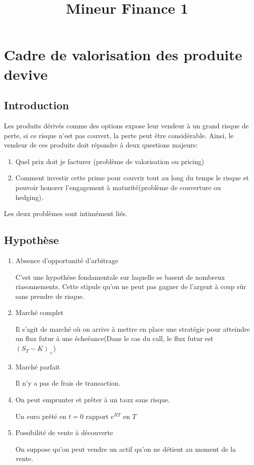 \documentclass{article}
\title{Mineur Finance 1}
\theoremstyle{plain}
\theoremstyle{definition}
\begin{document}
\maketitle

\tableofcontents
\pagebreak

\section{Cadre de valorisation des produite devive}
\subsection{Introduction}
Les produits d\'eriv\'es comme des options expose leur vendeur \`a un grand risque de perte, si ce risque n'est pas couvert, la perte peut \^etre consid\'erable. Ainsi, le vendeur de ces produits doit r\'epondre \`a deux questions majeurs:
\begin{enumerate}
	\item Quel prix doit je facturer (probl\`eme de valorisation ou pricing)
	\item Comment investir cette prime pour couvrir tout au long du temps le risque et pouvoir honorer l'engagement \`a maturit\'e(probl\`eme de couverture ou hedging).
\end{enumerate}

Les deux probl\`emes sont intim\'ement li\'es.
 
\subsection{Hypoth\`ese}
\begin{enumerate}
	\item Absence d'opportunit\'e d'arbitrage
	
	C'est une hypoth\`ese fondamentale sur laquelle se basent de nombreux riasonnements. Cette stipule qu'on ne peut pas gagner de l'argent \`a coup s\^ur sans prendre de risque.
	
	\item March\'e complet
	
	Il s'agit de march\'e o\`u on arrive \`a mettre en place une strat\'egie pour atteindre un flux futur \`a une \'eche\'eance(Dans le cas du call, le flux futur est $(S_T-K)_+$)
	
	\item March\'e parfait
	
	Il n'y a pas de frais de transaction.
	
	\item On peut emprunter et pr\^eter \`a un taux sans risque.
	
	Un euro pr\^et\'e en $t=0$ rapport $e^{RT}$ en $T$
	
	\item Possibilit\'e de vente \`a d\'ecouverte
	
	On suppose qu'on peut vendre un actif qu'on ne d\'etient au moment de la vente.
\end{enumerate}
\end{document}
